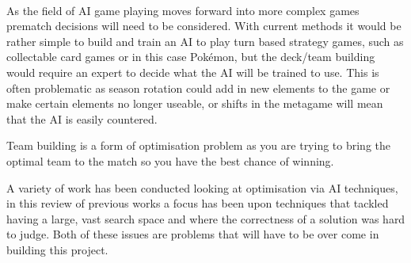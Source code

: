 \documentclass[a4paper]{article}
\newcommand{\Pokemon}{Pok\'{e}mon}
\begin{document}
\\ \par
As the field of AI game playing moves forward into more complex games prematch decisions will need to be considered.
With current methods it would be rather simple to build and train an AI to play turn based strategy games, such as collectable card games or in this case \Pokemon{}, but the deck/team building would require an expert to decide what the AI will be trained to use.
This is often problematic as season rotation could add in new elements to the game or make certain elements no longer useable, or shifts in the metagame will mean that the AI is easily countered.
\par
Team building is a form of optimisation problem as you are trying to bring the optimal team to the match so you have the best chance of winning.
\par
A variety of work has been conducted looking at optimisation via AI techniques, in this review of previous works a focus has been upon techniques that tackled having a large, vast search space and where the correctness of a solution was hard to judge.
Both of these issues are problems that will have to be over come in building this project.
\end{document}
